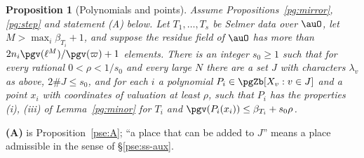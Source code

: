 \documentclass[10pt]{amsart}
\newtheorem{proposition}[theorem]{Proposition}
\theoremstyle{definition}
\theoremstyle{remark}
\begin{document}
\begin{proposition}[Polynomials and points]\label{pg:poly}
Assume Propositions~\ref{pg:mirror}, \ref{pg:step} and statement \emph{(A)} below. Let $T_1,\dots,T_s$ be Selmer data over
$\auO$, let $M>\max_i\beta_{T_i}+1$, and suppose the residue field of $\auO$ has more than
$2n_i\pgv(\ell^M)/\pgv(\varpi)+1$ elements. There is an integer $s_0\ge1$ such that for every
rational $0<\rho<1/s_0$ and every large $N$ there are a set $J$ with characters $\lambda_v$ as
above, $2\#J\le s_0$, and for each $i$ a polynomial $P_i\in\pgZb[X_v:v\in J]$ and a point $x_i$
with coordinates of valuation at least $\rho$, such that $P_i$ has the properties {\rm(i)},
{\rm(iii)} of Lemma~\ref{pg:minor} for $T_i$ and $\pgv(P_i(x_i))\le\beta_{T_i}+s_0\rho$.
\end{proposition}
\smallskip\noindent\textbf{(A)} is Proposition~\ref{pse:A}; ``a place that can be added to $J$'' means a place admissible in the sense of \S\ref{pse:ss-aux}.\par\smallskip
\end{document}
